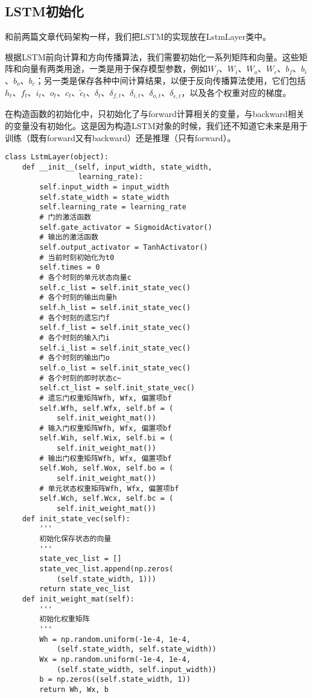 \subsection{LSTM初始化}\label{Lstm:11}

和前两篇文章代码架构一样，我们把LSTM的实现放在LstmLayer类中。

根据LSTM前向计算和方向传播算法，我们需要初始化一系列矩阵和向量。这些矩阵和向量有两类用途，一类是用于保存模型参数，例如\(W_f\)、\(W_i\)、\(W_o\)、\(W_c\)、\({b}_f\)、\({b}_i\)、\({b}_o\)、\({b}_c\)；另一类是保存各种中间计算结果，以便于反向传播算法使用，它们包括\({h}_t\)、\({f}_t\)、\({i}_t\)、\({o}_t\)、\({c}_t\)、\({\tilde{c}}_t\)、\(\delta_t\)、\(\delta_{f,t}\)、\(\delta_{i,t}\)、\(\delta_{o,t}\)、\(\delta_{\tilde{c},t}\)，以及各个权重对应的梯度。

在构造函数的初始化中，只初始化了与forward计算相关的变量，与backward相关的变量没有初始化。这是因为构造LSTM对象的时候，我们还不知道它未来是用于训练（既有forward又有backward）还是推理（只有forward）。
\begin{lstlisting}
class LstmLayer(object):
    def __init__(self, input_width, state_width, 
                 learning_rate):
        self.input_width = input_width
        self.state_width = state_width
        self.learning_rate = learning_rate
        # 门的激活函数
        self.gate_activator = SigmoidActivator()
        # 输出的激活函数
        self.output_activator = TanhActivator()
        # 当前时刻初始化为t0
        self.times = 0       
        # 各个时刻的单元状态向量c
        self.c_list = self.init_state_vec()
        # 各个时刻的输出向量h
        self.h_list = self.init_state_vec()
        # 各个时刻的遗忘门f
        self.f_list = self.init_state_vec()
        # 各个时刻的输入门i
        self.i_list = self.init_state_vec()
        # 各个时刻的输出门o
        self.o_list = self.init_state_vec()
        # 各个时刻的即时状态c~
        self.ct_list = self.init_state_vec()
        # 遗忘门权重矩阵Wfh, Wfx, 偏置项bf
        self.Wfh, self.Wfx, self.bf = (
            self.init_weight_mat())
        # 输入门权重矩阵Wfh, Wfx, 偏置项bf
        self.Wih, self.Wix, self.bi = (
            self.init_weight_mat())
        # 输出门权重矩阵Wfh, Wfx, 偏置项bf
        self.Woh, self.Wox, self.bo = (
            self.init_weight_mat())
        # 单元状态权重矩阵Wfh, Wfx, 偏置项bf
        self.Wch, self.Wcx, self.bc = (
            self.init_weight_mat())
    def init_state_vec(self):
        '''
        初始化保存状态的向量
        '''
        state_vec_list = []
        state_vec_list.append(np.zeros(
            (self.state_width, 1)))
        return state_vec_list
    def init_weight_mat(self):
        '''
        初始化权重矩阵
        '''
        Wh = np.random.uniform(-1e-4, 1e-4,
            (self.state_width, self.state_width))
        Wx = np.random.uniform(-1e-4, 1e-4,
            (self.state_width, self.input_width))
        b = np.zeros((self.state_width, 1))
        return Wh, Wx, b
\end{lstlisting}

